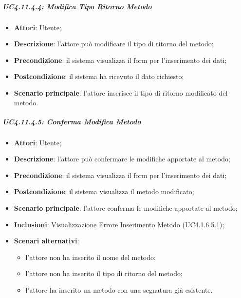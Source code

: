 \subparagraph{UC4.11.4.4: Modifica Tipo Ritorno Metodo}
\label{UC4.11.4.4}
\begin{itemize}
	\item \textbf{Attori}: Utente;
	\item \textbf{Descrizione}: l'attore può modificare il tipo di ritorno del metodo;
	\item \textbf{Precondizione}: il sistema visualizza il form per l'inserimento dei dati;
	\item \textbf{Postcondizione}: il sistema ha ricevuto il dato richiesto;
	\item \textbf{Scenario principale}: l'attore inserisce il tipo di ritorno modificato del metodo.
\end{itemize}

\subparagraph{UC4.11.4.5: Conferma Modifica Metodo}
\label{UC4.11.4.5}
\begin{itemize}
	\item \textbf{Attori}: Utente;
	\item \textbf{Descrizione}: l'attore può confermare le modifiche apportate al metodo;
	\item \textbf{Precondizione}: il sistema visualizza il form per l'inserimento dei dati;
	\item \textbf{Postcondizione}: il sistema visualizza il metodo modificato;
	\item \textbf{Scenario principale}: l'attore conferma le modifiche apportate al metodo;
	\item \textbf{Inclusioni}:
	Visualizzazione Errore Inserimento Metodo (UC4.1.6.5.1);
	\item \textbf{Scenari alternativi}:
	\begin{itemize}
		\item l'attore non ha inserito il nome del metodo;
		\item l'attore non ha inserito il tipo di ritorno del metodo;
		\item l'attore ha inserito un metodo con una segnatura già esistente.
	\end{itemize}
\end{itemize}

